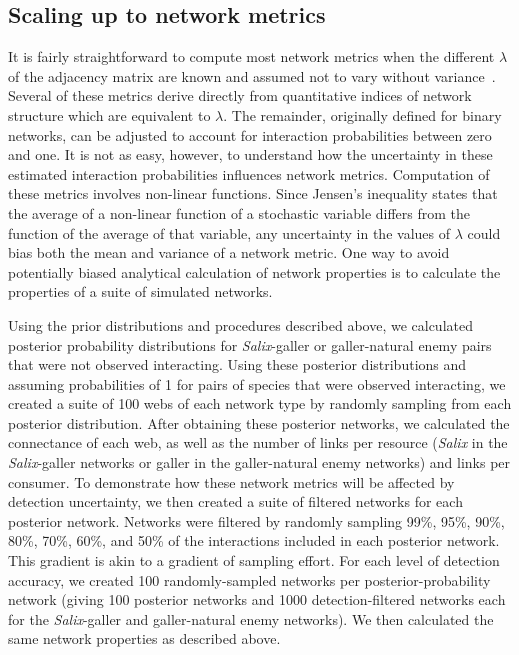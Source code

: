 \documentclass[12pt]{article}
\begin{document}
\begin{spacing}{2.0}
  \subsection*{Scaling up to network metrics}

    It is fairly straightforward to compute most network metrics when the different $\lambda$ of the adjacency matrix are known and assumed not to vary without variance~\citep{Poisot2016}. Several of these metrics derive directly from quantitative indices of network structure which are equivalent to $\lambda$. The remainder, originally defined for binary networks, can be adjusted to account for interaction probabilities between zero and one. It is not as easy, however, to understand how the uncertainty in these estimated interaction probabilities influences network metrics. Computation of these metrics involves non-linear functions. Since Jensen's inequality states that the average of a non-linear function of a stochastic variable differs from the function of the average of that variable, any uncertainty in the values of $\lambda$ could bias both the mean and variance of a network metric. One way to avoid potentially biased analytical calculation of network properties is to calculate the properties of a suite of simulated networks.

    Using the prior distributions and procedures described above, we calculated posterior probability distributions for \emph{Salix}-galler or galler-natural enemy pairs that were not observed interacting. Using these posterior distributions and assuming probabilities of 1 for pairs of species that were observed interacting, we created a suite of 100 webs of each network type by randomly sampling from each posterior distribution. After obtaining these posterior networks, we calculated the connectance of each web, as well as the number of links per resource (\emph{Salix} in the \emph{Salix}-galler networks or galler in the galler-natural enemy networks) and links per consumer. To demonstrate how these network metrics will be affected by detection uncertainty, we then created a suite of filtered networks for each posterior network. Networks were filtered by randomly sampling 99\%, 95\%, 90\%, 80\%, 70\%, 60\%, and 50\% of the interactions included in each posterior network. This gradient is akin to a gradient of sampling effort. For each level of detection accuracy, we created 100 randomly-sampled networks per posterior-probability network (giving 100 posterior networks and 1000 detection-filtered networks each for the \emph{Salix}-galler and galler-natural enemy networks). We then calculated the same network properties as described above.



\end{spacing}
\end{document}
